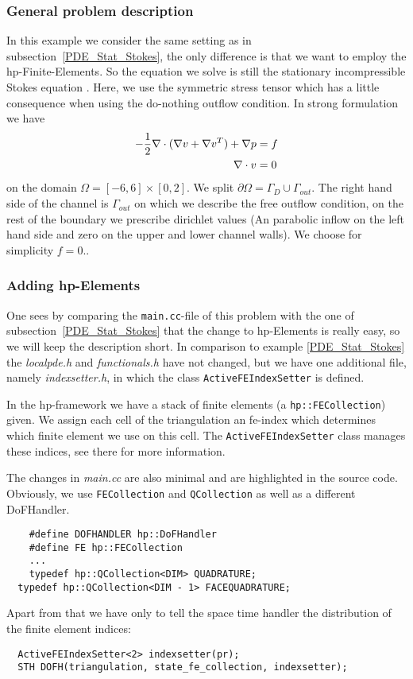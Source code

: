 \subsubsection{General problem description}
In this example we consider the same setting as in subsection~\ref{PDE_Stat_Stokes}, the only
difference is that we want to employ the hp-Finite-Elements. So the equation we solve is still 
the stationary incompressible Stokes equation . Here,
we use the symmetric stress tensor which has a little consequence when using 
the do-nothing outflow condition. In strong formulation we have
\begin{align} 
-\frac{1}{2}\nabla\cdot (\nabla v + \nabla v^{T}) + \nabla p &= f \\ 
\nabla \cdot v &= 0 \notag
\end{align} 
on the domain $\Omega = [-6,6]\times [0,2]$.  We split $\partial \Omega = \Gamma_D \cup \Gamma_{out}$. The right hand side of the channel is $\Gamma_{out}$ on which we describe the free outflow condition, on the rest of the boundary we prescribe dirichlet values (An parabolic inflow on the left hand side and zero on the upper and lower channel walls). We choose for simplicity $f=0$..\\

\subsubsection{Adding hp-Elements}
One sees by comparing  the \texttt{main.cc}-file of this problem with the one of subsection~\ref{PDE_Stat_Stokes} that the change to hp-Elements is really easy, so we will keep the description short. In comparison to example \ref{PDE_Stat_Stokes} the \textit{localpde.h} and \textit{functionals.h} have not changed, but we have one additional file, namely \textit{indexsetter.h}, in which the class \texttt{ActiveFEIndexSetter} is defined.

In the hp-framework we have a stack of finite elements (a \texttt{hp::FECollection}) given. We assign each cell of the triangulation an fe-index which determines which finite element we use on this cell. The \texttt{ActiveFEIndexSetter} class manages these indices, see there for more information.

The changes in \textit{main.cc} are also minimal and are highlighted in the source code. Obviously, we use \texttt{FECollection} and \texttt{QCollection} as well as a different DoFHandler.
\begin{verbatim}
  	#define DOFHANDLER hp::DoFHandler
  	#define FE hp::FECollection
  	...
  	typedef hp::QCollection<DIM> QUADRATURE;
  typedef hp::QCollection<DIM - 1> FACEQUADRATURE;
\end{verbatim}
Apart from that we have only to tell the space time handler the distribution of the finite element indices:
\begin{verbatim}
  ActiveFEIndexSetter<2> indexsetter(pr);
  STH DOFH(triangulation, state_fe_collection, indexsetter);
\end{verbatim}

